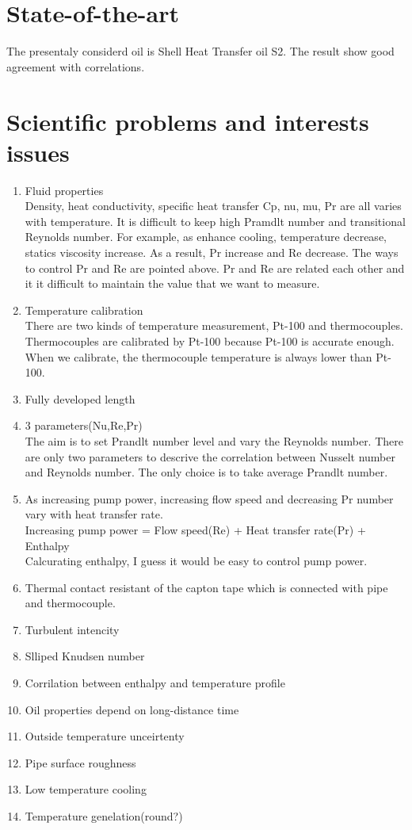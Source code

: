 \documentclass[conference]{IEEEtran}
\begin{document}
\section{State-of-the-art}
The presentaly considerd oil is Shell Heat Transfer oil S2.
The result show good agreement with correlations.

\section{Scientific problems and interests issues}
\begin{enumerate}
  \item Fluid properties\\
  Density, heat conductivity, specific heat transfer Cp, nu, mu, Pr are all varies with temperature.
  It is difficult to keep high Pramdlt number and transitional Reynolds number.
  For example, as enhance cooling, temperature decrease, statics viscosity increase.
  As a result, Pr increase and Re decrease.
  The ways to control Pr and Re are pointed above.
  Pr and Re are related each other and it it difficult to maintain the value that we want to measure.
  \item Temperature calibration\\
  There are two kinds of temperature measurement, Pt-100 and thermocouples.
  Thermocouples are calibrated by Pt-100 because Pt-100 is accurate enough.
  When we calibrate, the thermocouple temperature is always lower than Pt-100.
  \item Fully developed length\\
  \item 3 parameters(Nu,Re,Pr)\\
  The aim is to set Prandlt number level and vary the Reynolds number.
  There are only two parameters to descrive the correlation between Nusselt number and Reynolds number.
  The only choice is to take average Prandlt number.
  \item As increasing pump power, increasing flow speed and decreasing Pr number vary with heat transfer rate.\\
  Increasing pump power = Flow speed(Re) + Heat transfer rate(Pr) + Enthalpy\\
  Calcurating enthalpy, I guess it would be easy to control pump power.
  \item Thermal contact resistant of the capton tape which is connected with pipe and thermocouple.
  
  \item Turbulent intencity
  \item Slliped Knudsen number
  \item Corrilation between enthalpy and temperature profile
  
  \item Oil properties depend on long-distance time
  \item Outside temperature unceirtenty
  \item Pipe surface roughness
  \item Low temperature cooling
  \item Temperature genelation(round?)
\end{enumerate}
\end{document}
